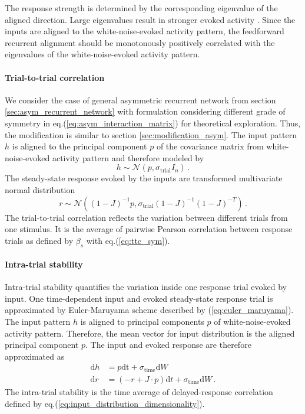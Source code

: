 \documentclass[11pt]{article}
\begin{document}
	The response strength is determined by the corresponding eigenvalue of the aligned direction. Large eigenvalues result in stronger evoked activity \cite{dayan2005theoretical}. Since the inputs are aligned to the white-noise-evoked activity pattern, the feedforward recurrent alignment should be monotonously positively correlated with the eigenvalues of the white-noise-evoked activity pattern. 
	
	\paragraph{Trial-to-trial correlation} We consider the case of general asymmetric recurrent network from section \ref{sec:asym_recurrent_network} with formulation considering different grade of symmetry in eq.(\ref{eq:asym_interaction_matrix}) for theoretical exploration. Thus, the modification is similar to section \ref{sec:modification_asym}. The input pattern $h$ is aligned to the principal component $p$ of the covariance matrix from white-noise-evoked activity pattern and therefore modeled by
		\begin{equation}
			h \sim \mathcal{N}(p, \sigma_{\text{trial}}I_n) \, .
		\end{equation}
	The steady-state response evoked by the inputs are transformed multivariate normal distribution
		\begin{equation}
			r \sim \mathcal{N}\left((1-J)^{-1}p, \sigma_{\text{trial}} (1-J)^{-1} (1-J)^{-T}\right) \, .
		\end{equation}
	The trial-to-trial correlation reflects the variation between different trials from one stimulus. It is the average of pairwise Pearson correlation between response trials as defined by $\beta_s$ with eq.(\ref{eq:ttc_sym}). 
	
	\paragraph{Intra-trial stability} Intra-trial stability quantifies the variation inside one response trial evoked by input. One time-dependent input and evoked steady-state response trial is approximated by Euler-Maruyama scheme described by (\ref{eq:euler_maruyama}). The input pattern $h$ is aligned to principal components $p$ of white-noise-evoked activity pattern. Therefore, the mean vector for input distribution is the aligned principal component $p$. The input and evoked response are therefore approximated as
		\begin{subequations}
			\begin{align}
				\mathrm{d} h & = p \mathrm{dt} + \sigma_{\text{time}} \mathrm{d} W \\
				\mathrm{d} r & = (-r + J \cdot p) \mathrm{d}t + \sigma_{\text{time}} \mathrm{d} W \, .
			\end{align}
		\end{subequations}
	The intra-trial stability is the time average of delayed-response correlation defined by eq.(\ref{eq:input_distribution_dimensionality}). 
	
\end{document}
